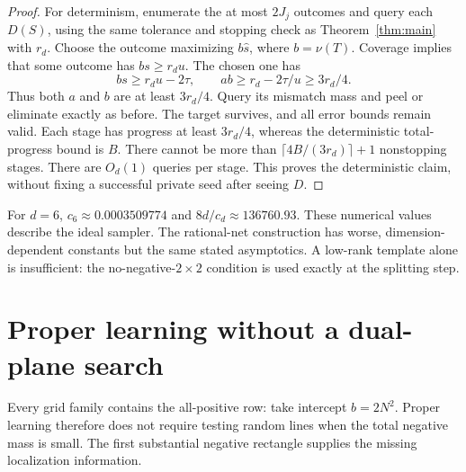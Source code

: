 \documentclass[11pt]{article}
\newcommand{\1}{\mathbf 1}
\begin{document}
\begin{proof}
For determinism, enumerate the at most $2J_j$ outcomes and query each $D(S)$, using the same tolerance and stopping check as Theorem~\ref{thm:main} with $r_d$. Choose the outcome maximizing $b\widehat s$, where $b=\nu(T)$. Coverage implies that some outcome has $bs\ge r_du$. The chosen one has
\[
 bs\ge r_du-2\tau,\qquad ab\ge r_d-2\tau/u\ge3r_d/4.
\]
Thus both $a$ and $b$ are at least $3r_d/4$. Query its mismatch mass and peel or eliminate exactly as before. The target survives, and all error bounds remain valid. Each stage has progress at least $3r_d/4$, whereas the deterministic total-progress bound is $B$. There cannot be more than $\lceil4B/(3r_d)\rceil+1$ nonstopping stages. There are $O_d(1)$ queries per stage. This proves the deterministic claim, without fixing a successful private seed after seeing $D$.
\end{proof}

For $d=6$, $c_6\approx0.0003509774$ and $8d/c_d\approx136760.93$. These numerical values describe the ideal sampler. The rational-net construction has worse, dimension-dependent constants but the same stated asymptotics. A low-rank template alone is insufficient: the no-negative-$2\times2$ condition is used exactly at the splitting step.



\section{Proper learning without a dual-plane search}\label{sec:proper}
Every grid family contains the all-positive row: take intercept $b=2N^2$. Proper learning therefore does not require testing random lines when the total negative mass is small. The first substantial negative rectangle supplies the missing localization information.
\end{document}
